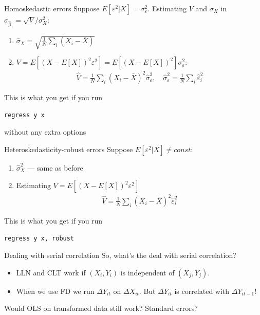 \documentclass[notes=show,beamer,compress]{beamer}
\begin{document}
\begin{frame}{Homoskedastic errors}
Suppose $E[\varepsilon^2|X] = \sigma_\varepsilon^2$. Estimating $V$ and $\sigma_X$ in $\sigma_{\widehat\beta_1} = \sqrt{V}/\sigma^2_X$:
\begin{enumerate}
	\item{$\widehat\sigma_X = \sqrt{\frac{1}{N}\sum_i(X_i-\bar{X})}$}
	\item{$V = E[(X-E[X])^2\varepsilon^2] = E[(X-E[X])^2]\sigma_\varepsilon^2$:
		\begin{align*}
			\widehat{V} = \frac{1}{N}\sum_i(X_i -\bar{X})^2\widehat{\sigma}_\varepsilon^2, \quad \widehat{\sigma}_\varepsilon^2 = \frac{1}{N}\sum_i\widehat{\varepsilon}_i^2
		\end{align*}
	}

\end{enumerate}

This is what you get if you run 
\begin{center}
	\texttt{regress y x} 
\end{center}
without any extra options

\end{frame}


\begin{frame}{Heteroskedasticity-robust errors}
Suppose $E[\varepsilon^2|X] \neq{const}$:
\begin{enumerate}
	\item{$\widehat{\sigma}_X^2$ --- same as before}
	\item{Estimating $V = E[(X-E[X])^2\varepsilon^2]$
		\begin{align*}
		\widehat{V} = \frac{1}{N}\sum_i(X_i -\bar{X})^2\widehat{\varepsilon}_i^2
		\end{align*}
	}
\end{enumerate}

This is what you get if you run 
\begin{center}
	\texttt{regress y x, robust} 
\end{center}
\end{frame}

\begin{frame}{Dealing with serial correlation}
So, what's the deal with serial correlation?
\begin{itemize}
	\item{}LLN and CLT work if $(X_i, Y_i)$ is independent of $(X_j, Y_j)$. 
	\item{}When we use FD we run $\Delta{}Y_{it}$ on $\Delta{}X_{it}$. But $\Delta{}Y_{it}$ is correlated with $\Delta{}Y_{it-1}$!
\end{itemize}
Would OLS on transformed data still work? Standard errors?

\end{frame}
\end{document}

